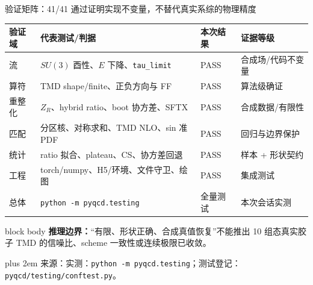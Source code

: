 \documentclass[UTF8,aspectratio=169,11pt]{ctexbeamer}
\renewcommand{\arraystretch}{0.92}
\newcommand{\source}[1]{%
  \par\vspace{0.02em}\begingroup\fontsize{6}{6.8}\selectfont\raggedright\sloppy
  \setlength{\emergencystretch}{3em}\rightskip=0pt plus 2em
  \color{muted}来源：#1\par\endgroup}
\begin{document}
\begin{frame}[t]{验证矩阵：41/41 通过证明实现不变量，不替代真实系综的物理精度}
  \footnotesize
  \renewcommand{\arraystretch}{0.82}
  \begin{tabularx}{0.98\textwidth}{@{}p{}Yp{0.22\textwidth}Y@{}}
    \toprule
    验证域 & 代表测试/判据 & 本次结果 & 证据等级\\
    \midrule
    流 & \(SU(3)\) 酉性、\(E\) 下降、\texttt{tau\_limit} & PASS & 合成场/代码不变量\\
    算符 & TMD shape/finite、正负方向与 FF & PASS & 算法级确证\\
    重整化 & \(Z_R\)、hybrid ratio、boot 协方差、SFTX & PASS & 合成数据/有限性\\
    匹配 & 分区核、对称求和、TMD NLO、sin 准 PDF & PASS & 回归与边界保护\\
    统计 & ratio 拟合、plateau、CS、协方差回退 & PASS & 样本 + 形状契约\\
    工程 & torch/numpy、H5/环境、文件守卫、绘图 & PASS & 集成测试\\
    总体 & \nolinkurl{python -m pyqcd.testing} & 全量测试 & 本次会话实测\\
    \bottomrule
  \end{tabularx}
  \vspace{0.1em}
  \begin{beamercolorbox}[wd=0.98\textwidth,sep=0.18em,rounded=true]{block body}
    \scriptsize\textbf{推理边界：}“有限、形状正确、合成真值恢复”不能推出
    10 组态真实胶子 TMD 的信噪比、scheme 一致性或连续极限已收敛。
  \end{beamercolorbox}
  \source{实测：\texttt{python -m pyqcd.testing}；测试登记：\nolinkurl{pyqcd/testing/conftest.py}。}
\end{frame}
\end{document}
